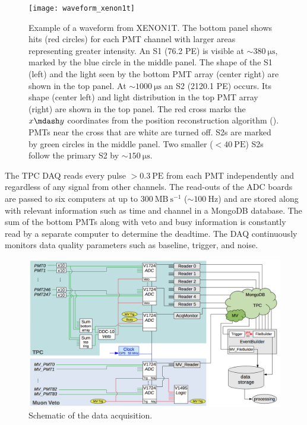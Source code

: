 \begin{figure}
\centering
\texttt{[image: waveform\_xenon1t]}
\caption{Example of a waveform from XENON1T.  The bottom panel shows hits (red circles) for each PMT channel with
larger areas representing greater intensity.  An S1 (76.2 PE) is visible at ${\sim}380\ \mathrm{\mu s}$, marked by the blue circle in the
middle panel.  The shape of the S1 (left) and the light seen by the bottom PMT array (center right) are shown in the top panel.  At
${\sim} 1000\ \mathrm{\mu s}$ an S2 (2120.1 PE) occurs.  Its shape (center left) and light distribution in the top PMT array (right) are
shown in the top panel.  The red cross marks the $x \mdash y$ coordinates from the position reconstruction algorithm
().  PMTs near the cross that are white are turned off.  S2s are marked by
green circles in the middle panel.  Two smaller ($< 40\ \mathrm{PE}$) S2s follow the primary S2 by ${\sim}150\ \mathrm{\mu s}$.}
\label{fig:xenon1t_waveform}
\end{figure}

The TPC DAQ reads every pulse $> 0.3\ \mathrm{PE}$ from each PMT independently and regardless of any signal from other
channels.  The read-outs of the ADC boards are passed to six computers at up to $300\ \mathrm{MB\ s^{-1}}$ (${\sim}100\ \mathrm{Hz}$) and
are stored along with relevant information such as time and channel in a MongoDB database.  The sum of the bottom PMTs along with veto
and busy information is constantly read by a separate computer to determine the deadtime.  The DAQ continuously monitors data quality
parameters such as baseline, trigger, and noise.

\begin{figure}
\centering
\includegraphics[width=\textwidth]{DAQ}
\caption{Schematic of the data acquisition.}
\label{fig:xenon1t_daq_schematic}
\end{figure}

